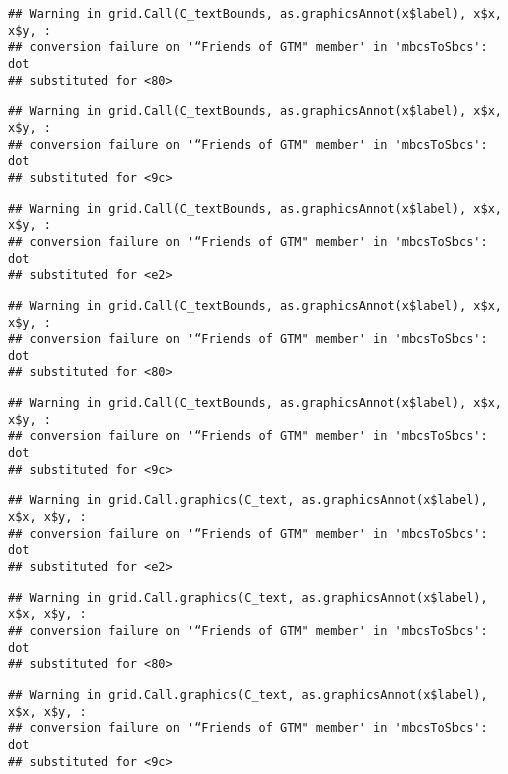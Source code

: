 \documentclass[
]{article}
\begin{document}
\begin{verbatim}
## Warning in grid.Call(C_textBounds, as.graphicsAnnot(x$label), x$x, x$y, :
## conversion failure on '“Friends of GTM" member' in 'mbcsToSbcs': dot
## substituted for <80>
\end{verbatim}

\begin{verbatim}
## Warning in grid.Call(C_textBounds, as.graphicsAnnot(x$label), x$x, x$y, :
## conversion failure on '“Friends of GTM" member' in 'mbcsToSbcs': dot
## substituted for <9c>
\end{verbatim}

\begin{verbatim}
## Warning in grid.Call(C_textBounds, as.graphicsAnnot(x$label), x$x, x$y, :
## conversion failure on '“Friends of GTM" member' in 'mbcsToSbcs': dot
## substituted for <e2>
\end{verbatim}

\begin{verbatim}
## Warning in grid.Call(C_textBounds, as.graphicsAnnot(x$label), x$x, x$y, :
## conversion failure on '“Friends of GTM" member' in 'mbcsToSbcs': dot
## substituted for <80>
\end{verbatim}

\begin{verbatim}
## Warning in grid.Call(C_textBounds, as.graphicsAnnot(x$label), x$x, x$y, :
## conversion failure on '“Friends of GTM" member' in 'mbcsToSbcs': dot
## substituted for <9c>
\end{verbatim}

\begin{verbatim}
## Warning in grid.Call.graphics(C_text, as.graphicsAnnot(x$label), x$x, x$y, :
## conversion failure on '“Friends of GTM" member' in 'mbcsToSbcs': dot
## substituted for <e2>
\end{verbatim}

\begin{verbatim}
## Warning in grid.Call.graphics(C_text, as.graphicsAnnot(x$label), x$x, x$y, :
## conversion failure on '“Friends of GTM" member' in 'mbcsToSbcs': dot
## substituted for <80>
\end{verbatim}

\begin{verbatim}
## Warning in grid.Call.graphics(C_text, as.graphicsAnnot(x$label), x$x, x$y, :
## conversion failure on '“Friends of GTM" member' in 'mbcsToSbcs': dot
## substituted for <9c>
\end{verbatim}
\end{document}
